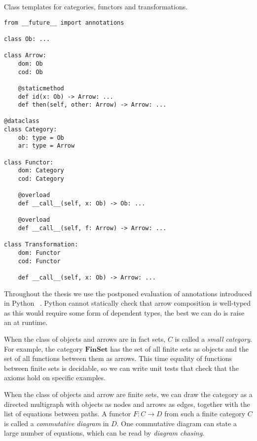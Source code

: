 \begin{python}\label{listing:abstract classes}
{\normalfont Class templates for categories, functors and transformations.}

\begin{verbatim}
from __future__ import annotations

class Ob: ...

class Arrow:
    dom: Ob
    cod: Ob

    @staticmethod
    def id(x: Ob) -> Arrow: ...
    def then(self, other: Arrow) -> Arrow: ...

@dataclass
class Category:
    ob: type = Ob
    ar: type = Arrow

class Functor:
    dom: Category
    cod: Category

    @overload
    def __call__(self, x: Ob) -> Ob: ...

    @overload
    def __call__(self, f: Arrow) -> Arrow: ...

class Transformation:
    dom: Functor
    cod: Functor

    def __call__(self, x: Ob) -> Arrow: ...
\end{verbatim}
\end{python}

\begin{remark}
Throughout the thesis we use the postponed evaluation of annotations introduced in Python ~\cite{Langa17}.
Python cannot statically check that arrow composition is well-typed as this would require some form of dependent types, the best we can do is raise an  at runtime.
\end{remark}

\begin{example}
When the class of objects and arrows are in fact sets, $C$ is called a \emph{small category}.
For example, the category $\mathbf{FinSet}$ has the set of all finite sets as objects and the set of all functions between them as arrows.
This time equality of functions between finite sets is decidable, so we can write unit tests that check that the axioms hold on specific examples.
\end{example}

\begin{example}
When the class of objects and arrow are finite sets, we can draw the category as a directed multigraph with objects as nodes and arrows as edges, together with the list of equations between paths.
A functor $F : C \to D$ from such a finite category $C$ is called a \emph{commutative diagram} in $D$.
One commutative diagram can state a large number of equations, which can be read by \emph{diagram chasing}.
\end{example}

